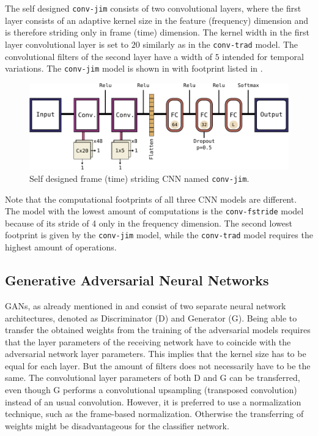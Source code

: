 The self designed \texttt{conv-jim} consists of two convolutional layers, where the first layer consists of an adaptive kernel size in the feature (frequency) dimension and is therefore striding only in frame (time) dimension.
The kernel width in the first layer convolutional layer is set to $20$ similarly as in the \texttt{conv-trad} model.
The convolutional filters of the second layer have a width of $5$ intended for temporal variations.
The \texttt{conv-jim} model is shown in  with footprint listed in .
\begin{figure}[!ht]
  \centering
    \includegraphics[height=0.23\textwidth]{./4_nn/figs/nn_arch_cnn_jim.pdf}
  \caption{Self designed frame (time) striding CNN named \texttt{conv-jim}.}
  \label{fig:nn_arch_cnn_jim}
\end{figure}
\FloatBarrier
\noindent


Note that the computational footprints of all three CNN models are different.
The model with the lowest amount of computations is the \texttt{conv-fstride} model because of its stride of 4 only in the frequency dimension.
The second lowest footprint is given by the \texttt{conv-jim} model, while the \texttt{conv-trad} model requires the highest amount of operations.



\subsection{Generative Adversarial Neural Networks}\label{sec:nn_arch_adv}
GANs, as already mentioned in  and  consist of two separate neural network architectures, denoted as Discriminator (D) and Generator (G).
Being able to transfer the obtained weights from the training of the adversarial models requires that the layer parameters of the receiving network have to coincide with the adversarial network layer parameters.
This implies that the kernel size has to be equal for each layer.
But the amount of filters does not necessarily have to be the same.
The convolutional layer parameters of both D and G can be transferred, even though G performs a convolutional upsampling (transposed convolution) instead of an usual convolution.
However, it is preferred to use a normalization technique, such as the frame-based normalization. 
Otherwise the transferring of weights might be disadvantageous for the classifier network.

